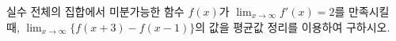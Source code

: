 실수 전체의 집합에서 미분가능한 함수 $f(x)$가 $\displaystyle\lim_{x\to\infty} f'(x)=2$를 만족시킬 때, $\displaystyle\lim_{x\to\infty}\{f(x+3)-f(x-1)\}$의 값을 평균값 정리를 이용하여 구하시오.
